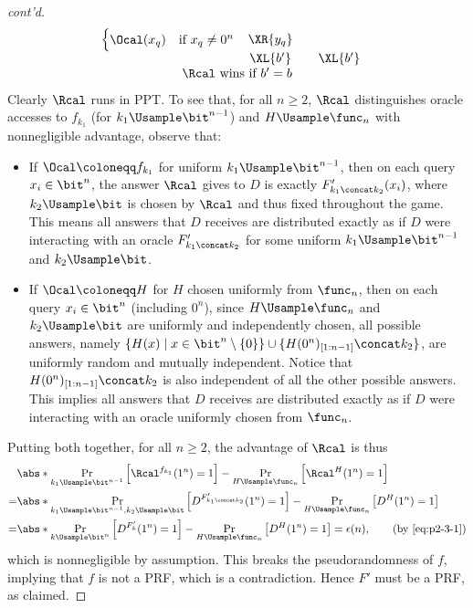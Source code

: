 \begin{answer}[c]
\begin{proof}[cont'd]
{\[\begin{array}{@{} c c c c c@{}}
\begin{cases}
                    \Ocal(x_q) &\textrm{if } x_q\neq 0^n
                \end{cases} & \XR{y_q} & \\
                & \XL{b'} & & \XL{b'} & \\
                \multicolumn{5}{c}{\text{$\Rcal$ wins if $b' = b$}}
                \end{array}
            \]
            \label{fig:p2-game2}
        }
        Clearly $\Rcal$ runs in PPT. To see that, for all $n\ge 2$, $\Rcal$ distinguishes oracle accesses to $f_{k_1}$ (for $k_1\Usample \bit^{n-1}$) and $H\Usample\func_n$ with nonnegligible advantage, observe that:
        \begin{itemize}
            \item If $\Ocal \coloneqq f_{k_1}$ for uniform $k_1\Usample\bit^{n-1}$, then on each query $x_i\in\bit^n$, the answer $\Rcal$ gives to $D$ is exactly $F'_{k_1\concat k_2}(x_i)$, where $k_2\Usample\bit$ is chosen by $\Rcal$ and thus fixed throughout the game. This means all answers that $D$ receives are distributed exactly as if $D$ were interacting with an oracle $F'_{k_1\concat k_2}$ for some uniform $k_1\Usample\bit^{n-1}$ and $k_2\Usample\bit$.
            
            \item If $\Ocal \coloneqq H$ for $H$ chosen uniformly from $\func_n$, then on each query $x_i\in\bit^n$ (including $0^n$), since $H\Usample\func_n$ and $k_2\Usample\bit$ are uniformly and independently chosen, all possible answers, namely $\{H(x)\mid x\in\bit^n\setminus\{0\}\}\cup \{H(0^n)_{[1:n-1]}\concat k_2\}$, are uniformly random and mutually independent. Notice that $H(0^n)_{[1:n-1]}\concat k_2$ is also independent of all the other possible answers.             
            This implies all answers that $D$ receives are distributed exactly as if $D$ were interacting with an oracle uniformly chosen from $\func_n$.
        \end{itemize}
        Putting both together, for all $n\ge 2$, the advantage of $\Rcal$ is thus
        \begin{align*}
            &\abs*{\Pr_{k_1\Usample\bit^{n-1}}\left[\Rcal^{f_{k_1}}(1^n)=1 \right] - \Pr_{H\Usample\func_n}\left[\Rcal^{H}(1^n)=1 \right]}\\
            =&\abs*{\Pr_{k_1\Usample\bit^{n-1},k_2\Usample\bit}\left[D^{F'_{k_1\concat k_2}}(1^n)=1 \right] - \Pr_{H\Usample\func_n}\left[D^{H}(1^n)=1 \right]}\\
            =&\abs*{\Pr_{k\Usample\bit^n}\left[D^{F'_{k}}(1^n)=1 \right] - \Pr_{H\Usample\func_n}\left[D^{H}(1^n)=1 \right]}
            = \epsilon(n), \qquad \textrm{(by \eqref{eq:p2-3-1})}
        \end{align*}
        which is nonnegligible by assumption. This breaks the pseudorandomness of $f$, implying that $f$ is not a PRF, which is a contradiction. Hence $F'$ must be a PRF, as claimed.
    \end{proof}



\end{answer}
